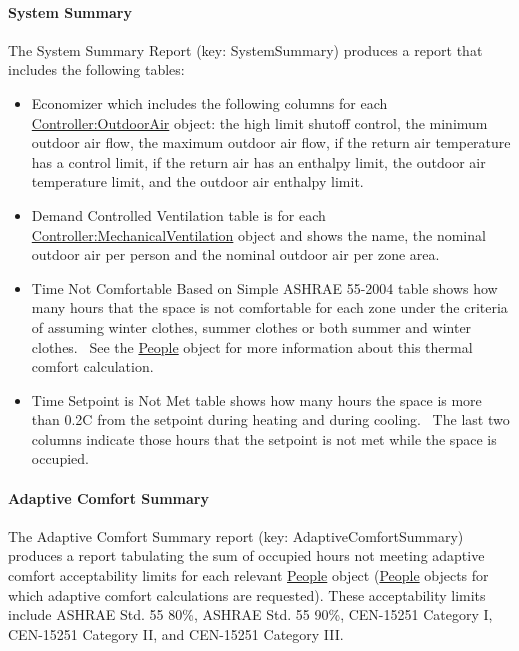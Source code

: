 \paragraph{System Summary}\label{system-summary}

The System Summary Report (key: SystemSummary) produces a report that includes the following tables:

\begin{itemize}
\item
  Economizer which includes the following columns for each \hyperref[controlleroutdoorair]{Controller:OutdoorAir} object: the high limit shutoff control, the minimum outdoor air flow, the maximum outdoor air flow, if the return air temperature has a control limit, if the return air has an enthalpy limit, the outdoor air temperature limit, and the outdoor air enthalpy limit.
\item
  Demand Controlled Ventilation table is for each \hyperref[controllermechanicalventilation]{Controller:MechanicalVentilation} object and shows the name, the nominal outdoor air per person and the nominal outdoor air per zone area.
\item
  Time Not Comfortable Based on Simple ASHRAE 55-2004 table shows how many hours that the space is not comfortable for each zone under the criteria of assuming winter clothes, summer clothes or both summer and winter clothes.~ See the \hyperref[people]{People} object for more information about this thermal comfort calculation.
\item
  Time Setpoint is Not Met table shows how many hours the space is more than 0.2C from the setpoint during heating and during cooling.~ The last two columns indicate those hours that the setpoint is not met while the space is occupied.
\end{itemize}

\paragraph{Adaptive Comfort Summary}\label{adaptive-comfort-summary}

The Adaptive Comfort Summary report (key: AdaptiveComfortSummary) produces a report tabulating the sum of occupied hours not meeting adaptive comfort acceptability limits for each relevant \hyperref[people]{People} object (\hyperref[people]{People} objects for which adaptive comfort calculations are requested). These acceptability limits include ASHRAE Std. 55 80\%, ASHRAE Std. 55 90\%, CEN-15251 Category I, CEN-15251 Category II, and CEN-15251 Category III.

